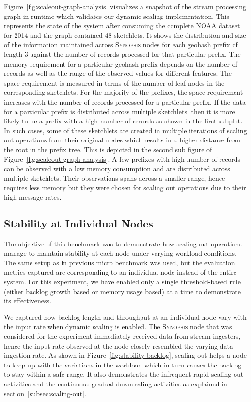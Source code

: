 Figure~\ref{fig:scaleout-graph-analysis} visualizes a snapshot of the stream processing graph in runtime which validates our dynamic scaling implementation. 
This represents the state of the system after consuming the complete NOAA dataset for 2014 and the graph contained 48 sketchlets. 
It shows the distribution and size of the information maintained across \textsc{Synopsis} nodes for each geohash prefix of length 3 against the number of records processed for that particular prefix.
The memory requirement for a particular geohash prefix depends on the number of records as well as the range of the observed values for different features.
The space requirement is measured in terms of the number of leaf nodes in the corresponding sketchlets.
For the majority of the prefixes, the space requirement increases with the number of records processed for a particular prefix.
If the data for a particular prefix is distributed across multiple sketchlets, then it is more likely to be a prefix with a high number of records as shown in the first subplot.
In such cases, some of these sketchlets are created in multiple iterations of scaling out operations from their original nodes which results in a higher distance from the root in the prefix tree. This is depicted in the second sub figure of Figure~\ref{fig:scaleout-graph-analysis}.
A few prefixes with high number of records can be observed with a low memory consumption and are distributed across multiple sketchlets.
Their observations spans across a smaller range, hence requires less memory but they were chosen for scaling out operations due to their high message rates. 


\subsection{Stability at Individual Nodes}
The objective of this benchmark was to demonstrate how scaling out operations manage to maintain stability at each node under varying workload conditions.
The same setup as in previous micro benchmark was used, but the evaluation metrics captured are corresponding to an individual node instead of the entire system.
For this experiment, we have enabled only a single threshold-based rule (either backlog growth based or memory usage based) at a time to demonstrate its effectiveness.

We captured how backlog length and throughput at an individual node vary with the input rate when dynamic scaling is enabled.
The \textsc{Synopsis} node that was considered for the experiment immediately received data from stream ingesters, hence the input rate observed at the node closely resembled the varying data ingestion rate.
As shown in Figure~\ref{fig:stability-backlog}, scaling out helps a node to keep up with the variations in the workload which in turn causes the backlog to stay within a safe range.
It also demonstrates the infrequent rapid scaling out activities and the continuous gradual downscaling activities as explained in section~\ref{subsec:scaling-out}.

